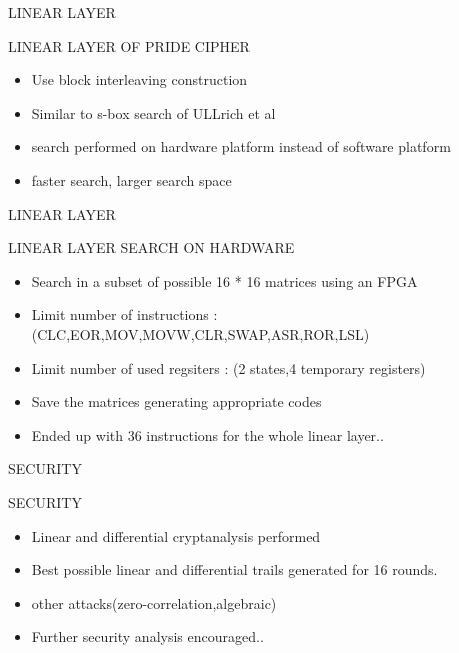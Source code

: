 \begin{frame}{LINEAR LAYER}
\begin{block}{LINEAR LAYER OF PRIDE CIPHER}
    \begin{itemize}
            \item Use block interleaving construction
            \item Similar to s-box search of ULLrich et al
            \item search performed on hardware platform instead of software platform
            \item faster search, larger search space
        \end{itemize}
    \end{block}
\end{frame}
\begin{frame}{LINEAR LAYER}
\begin{block}{LINEAR LAYER SEARCH ON HARDWARE}
    \begin{itemize}
            \item Search in a subset of possible 16 * 16 matrices using an FPGA
            \item Limit number of instructions : (CLC,EOR,MOV,MOVW,CLR,SWAP,ASR,ROR,LSL)
           \item Limit number of used regsiters : (2 states,4 temporary registers)
           \item Save the matrices generating appropriate codes
           \item Ended up with 36 instructions for the whole linear layer..
        \end{itemize}
    \end{block}
\end{frame}
\begin{frame}{SECURITY}
\begin{block}{SECURITY}
    \begin{itemize}
           \item Linear and differential cryptanalysis performed
           \item Best possible linear and differential trails generated for 16 rounds.
           \item other attacks(zero-correlation,algebraic)
           \item Further security analysis encouraged..
        \end{itemize}
    \end{block}
\end{frame}